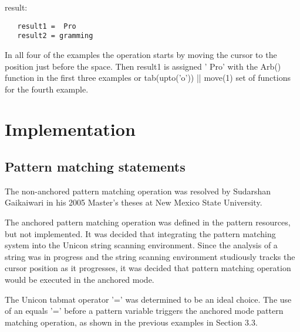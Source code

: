 \documentclass{article}
\begin{document}
\noindent
result:
\begin{verbatim}
   result1 =  Pro
   result2 = gramming
\end{verbatim}

In all four of the examples the operation starts by moving the cursor to the position just before the space.  Then result1 is assigned ' Pro' with the Arb() function in the first three examples or tab(upto('o')) || move(1) set of functions for the fourth example.
\section{Implementation}

\subsection{Pattern matching statements}
The non-anchored pattern matching operation was resolved by Sudarshan Gaikaiwari in his 2005 Master's theses at New Mexico State University.  

The anchored pattern matching operation was defined in the pattern resources, but not implemented.  It was decided that integrating the pattern matching system into the Unicon string scanning environment.  Since the analysis of a string was in progress and the string scanning environment studiously tracks the cursor position as it progresses, it was decided that pattern matching operation would be executed in the anchored mode.

The Unicon tabmat operator '=' was determined to be an ideal choice.  The use of an equals '=' before a pattern variable triggers the anchored mode pattern matching operation, as shown in the previous examples in Section 3.3.
\end{document}
